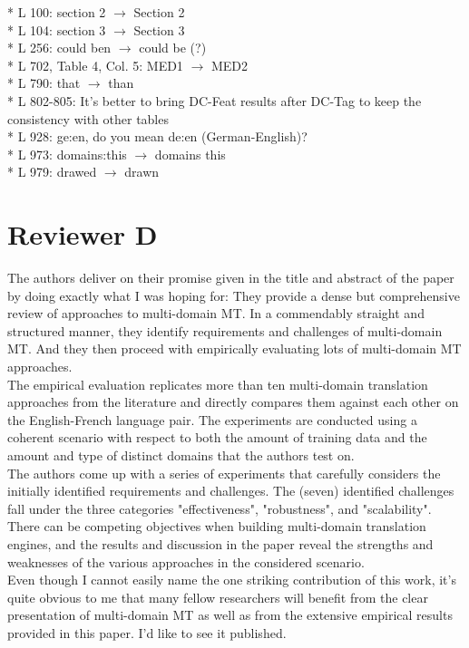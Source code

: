 \documentclass[12pt,times,a4paper,twoside]{article}
\theoremstyle{definition}
\begin{document}
* L 100: section 2 $\rightarrow$ Section 2
\\
* L 104: section 3 $\rightarrow$ Section 3
\\
* L 256: could ben $\rightarrow$ could be (?)
\\
* L 702, Table 4, Col. 5: MED1 $\rightarrow$ MED2
\\
* L 790: that $\rightarrow$ than
\\
* L 802-805: It’s better to bring DC-Feat results after DC-Tag to keep the consistency with other tables 
\\
* L 928: ge:en, do you mean de:en (German-English)? 
\\
* L 973: domains:this $\rightarrow$ domains this
\\
* L 979: drawed $\rightarrow$ drawn 
\section*{Reviewer D}
The authors deliver on their promise given in the title and abstract of the paper by doing exactly what I was hoping for: They provide a dense but comprehensive review of approaches to multi-domain MT. In a commendably straight and structured manner, they identify requirements and challenges of multi-domain MT. And they then proceed with empirically evaluating lots of multi-domain MT approaches.
\\
The empirical evaluation replicates more than ten multi-domain translation approaches from the literature and directly compares them against each other on the English-French language pair. The experiments are conducted using a coherent scenario with respect to both the amount of training data and the amount and type of distinct domains that the authors test on.
\\
The authors come up with a series of experiments that carefully considers the initially identified requirements and challenges. The (seven) identified challenges fall under the three categories "effectiveness", "robustness", and "scalability". There can be competing objectives when building multi-domain translation engines, and the results and discussion in the paper reveal the strengths and weaknesses of the various approaches in the considered scenario.
\\
Even though I cannot easily name the one striking contribution of this work, it's quite obvious to me that many fellow researchers will benefit from the clear presentation of multi-domain MT as well as from the extensive empirical results provided in this paper. I'd like to see it published.
\end{document}
